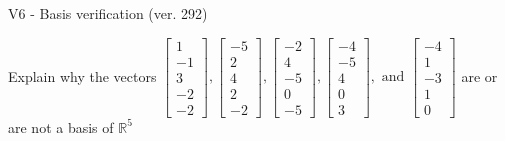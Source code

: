 \begin{exercise}
  \begin{exerciseTitle}V6 - Basis verification (ver. 292)\end{exerciseTitle}
  \begin{exerciseStatement}
    Explain why the vectors \(\left[\begin{array}{r}
1 \\
-1 \\
3 \\
-2 \\
-2
\end{array}\right] , \left[\begin{array}{r}
-5 \\
2 \\
4 \\
2 \\
-2
\end{array}\right] , \left[\begin{array}{r}
-2 \\
4 \\
-5 \\
0 \\
-5
\end{array}\right] , \left[\begin{array}{r}
-4 \\
-5 \\
4 \\
0 \\
3
\end{array}\right] , \text{ and } \left[\begin{array}{r}
-4 \\
1 \\
-3 \\
1 \\
0
\end{array}\right]\) are or are not a basis of \(\mathbb{R}^5\)	



\end{exerciseStatement}
\end{exercise}
